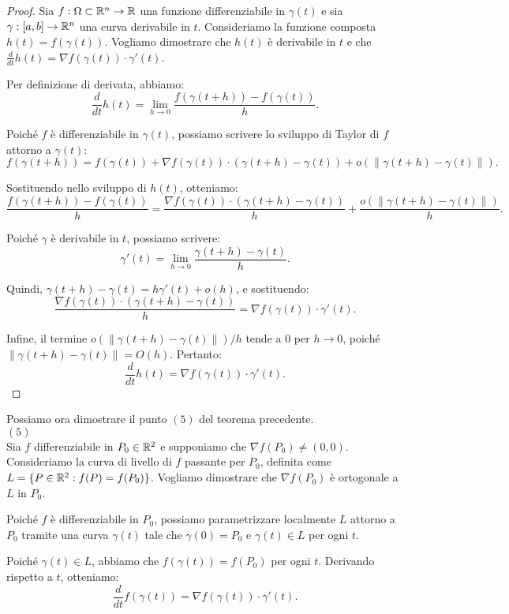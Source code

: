 \begin{proof}
Sia $f:\Omega \subset \mathbb{R}^n \to \mathbb{R}$ una funzione differenziabile in $\gamma(t)$ e sia $\gamma:[a,b] \to \mathbb{R}^n$ una curva derivabile in $t$. Consideriamo la funzione composta $h(t) = f(\gamma(t))$. Vogliamo dimostrare che $h(t)$ è derivabile in $t$ e che $\frac{d}{dt} h(t) = \nabla f(\gamma(t)) \cdot \gamma'(t)$.

Per definizione di derivata, abbiamo:
\[
\frac{d}{dt} h(t) = \lim_{h \to 0} \frac{f(\gamma(t+h)) - f(\gamma(t))}{h}.
\]

Poiché $f$ è differenziabile in $\gamma(t)$, possiamo scrivere lo sviluppo di Taylor di $f$ attorno a $\gamma(t)$:
\[
f(\gamma(t+h)) = f(\gamma(t)) + \nabla f(\gamma(t)) \cdot (\gamma(t+h) - \gamma(t)) + o(\|\gamma(t+h) - \gamma(t)\|).
\]

Sostituendo nello sviluppo di $h(t)$, otteniamo:
\[
\frac{f(\gamma(t+h)) - f(\gamma(t))}{h} = \frac{\nabla f(\gamma(t)) \cdot (\gamma(t+h) - \gamma(t))}{h} + \frac{o(\|\gamma(t+h) - \gamma(t)\|)}{h}.
\]

Poiché $\gamma$ è derivabile in $t$, possiamo scrivere:
\[
\gamma'(t) = \lim_{h \to 0} \frac{\gamma(t+h) - \gamma(t)}{h}.
\]

Quindi, $\gamma(t+h) - \gamma(t) = h \gamma'(t) + o(h)$, e sostituendo:
\[
\frac{\nabla f(\gamma(t)) \cdot (\gamma(t+h) - \gamma(t))}{h} = \nabla f(\gamma(t)) \cdot \gamma'(t).
\]

Infine, il termine $o(\|\gamma(t+h) - \gamma(t)\|)/h$ tende a $0$ per $h \to 0$, poiché $\|\gamma(t+h) - \gamma(t)\| = O(h)$. Pertanto:
\[
\frac{d}{dt} h(t) = \nabla f(\gamma(t)) \cdot \gamma'(t).
\]
\end{proof}

Possiamo ora dimostrare il punto $(5)$ del teorema precedente.\\
$(5)$\\
Sia $f$ differenziabile in $P_0 \in \mathbb{R}^2$ e supponiamo che $\nabla f(P_0) \neq (0, 0)$. Consideriamo la curva di livello di $f$ passante per $P_0$, definita come $L = \{P \in \mathbb{R}^2 : f(P) = f(P_0)\}$. Vogliamo dimostrare che $\nabla f(P_0)$ è ortogonale a $L$ in $P_0$.

Poiché $f$ è differenziabile in $P_0$, possiamo parametrizzare localmente $L$ attorno a $P_0$ tramite una curva $\gamma(t)$ tale che $\gamma(0) = P_0$ e $\gamma(t) \in L$ per ogni $t$.

Poiché $\gamma(t) \in L$, abbiamo che $f(\gamma(t)) = f(P_0)$ per ogni $t$. Derivando rispetto a $t$, otteniamo:
\[
\frac{d}{dt} f(\gamma(t)) = \nabla f(\gamma(t)) \cdot \gamma'(t).
\]

